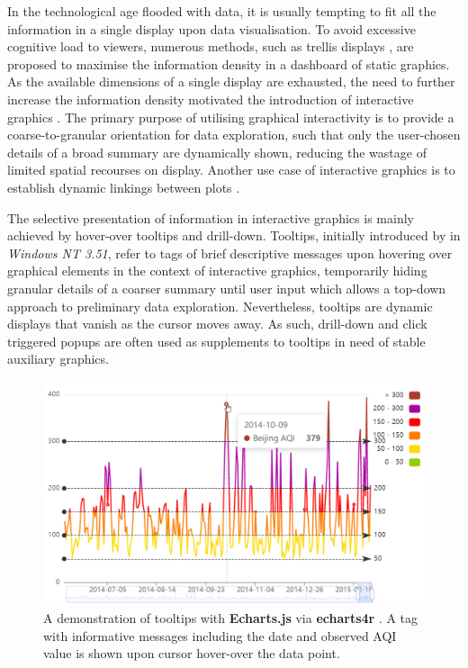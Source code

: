 \documentclass{aucklandthesis}
\begin{document}
In the technological age flooded with data, it is usually tempting to fit all the information in a single display upon data visualisation. To avoid excessive cognitive load to viewers, numerous methods, such as trellis displays \autocite{trellis}, are proposed to maximise the information density in a dashboard of static graphics. As the available dimensions of a single display are exhausted, the need to further increase the information density motivated the introduction of interactive graphics \autocite{intg}. The primary purpose of utilising graphical interactivity is to provide a coarse-to-granular orientation for data exploration, such that only the user-chosen details of a broad summary are dynamically shown, reducing the wastage of limited spatial recourses on display. Another use case of interactive graphics is to establish dynamic linkings between plots \autocite{intg}.

The selective presentation of information in interactive graphics is mainly achieved by hover-over tooltips and drill-down. Tooltips, initially introduced by \textcite{tt} in \emph{Windows NT 3.51}, refer to tags of brief descriptive messages upon hovering over graphical elements in the context of interactive graphics, temporarily hiding granular details of a coarser summary until user input which allows a top-down approach to preliminary data exploration. Nevertheless, tooltips are dynamic displays that vanish as the cursor moves away. As such, drill-down \autocite{plotly} and click triggered popups are often used as supplements to tooltips in need of stable auxiliary graphics.

\begin{figure}
\includegraphics[width=1\linewidth]{figures/tt-demo} \caption{A demonstration of tooltips with \textbf{Echarts.js} \autocite{echarts} via \textbf{echarts4r} \autocite{echarts4r}. A tag with informative messages including the date and observed AQI value is shown upon cursor hover-over the data point.}\label{fig:tt-demo}
\end{figure}
\end{document}
